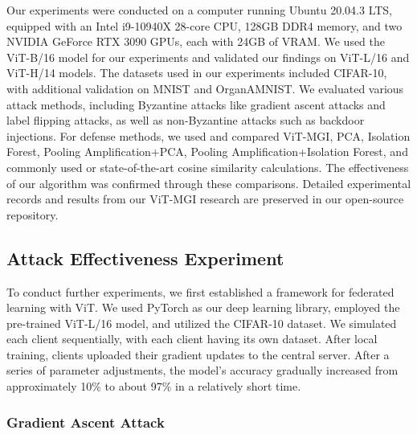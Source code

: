 \documentclass[conference]{IEEEtran}
\begin{document}
Our experiments were conducted on a computer running Ubuntu 20.04.3 LTS, equipped with an Intel i9-10940X 28-core CPU, 128GB DDR4 memory, and two NVIDIA GeForce RTX 3090 GPUs, each with 24GB of VRAM. We used the ViT-B/16 model for our experiments and validated our findings on ViT-L/16 and ViT-H/14 models. The datasets used in our experiments included CIFAR-10, with additional validation on MNIST and OrganAMNIST. We evaluated various attack methods, including Byzantine attacks like gradient ascent attacks and label flipping attacks, as well as non-Byzantine attacks such as backdoor injections. For defense methods, we used and compared ViT-MGI, PCA, Isolation Forest, Pooling Amplification\cite{betterTogether}+PCA, Pooling Amplification+Isolation Forest, and commonly used or state-of-the-art cosine similarity calculations. The effectiveness of our algorithm was confirmed through these comparisons. Detailed experimental records and results from our ViT-MGI research are preserved in our open-source repository.

\subsection{Attack Effectiveness Experiment}
\label{exp:attack}


To conduct further experiments, we first established a framework for federated learning with ViT. We used PyTorch as our deep learning library, employed the pre-trained ViT-L/16 model, and utilized the CIFAR-10 dataset. We simulated each client sequentially, with each client having its own dataset. After local training, clients uploaded their gradient updates to the central server. After a series of parameter adjustments, the model's accuracy gradually increased from approximately 10\% to about 97\% in a relatively short time.

\subsubsection{\textbf{Gradient Ascent Attack}}
\label{exp:attack:grad}
\end{document}
